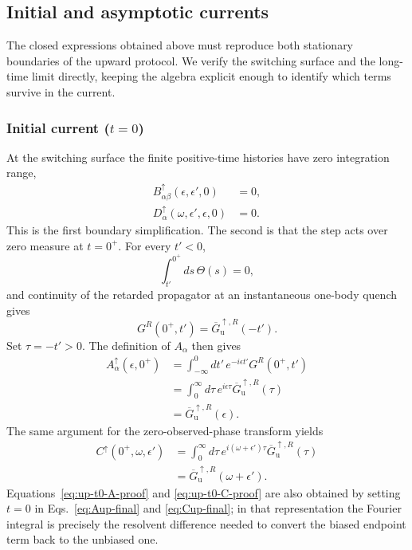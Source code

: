 \documentclass[
 reprint,
 superscriptaddress,
 amsmath,amssymb,
 aps,prb,
 longbibliography,
 floatfix
]{revtex4-2}
\begin{document}
\subsection{Initial and asymptotic currents}
\label{sec:up-initial-asymptotic}

The closed expressions obtained above must reproduce both stationary boundaries of the upward protocol. We verify the switching surface and the long-time limit directly, keeping the algebra explicit enough to identify which terms survive in the current.

\subsubsection{Initial current ($t=0$)}

At the switching surface the finite positive-time histories have zero integration range,
\begin{equation*}
\begin{aligned}
B_{\alpha\beta}^{\uparrow}
(\epsilon,\epsilon',0)&=0,
\\
D_\alpha^{\uparrow}
(\omega,\epsilon',\epsilon,0)&=0.
\end{aligned}
\end{equation*}
This is the first boundary simplification. The second is that the step acts over zero measure at $t=0^+$. For every $t'<0$,
\begin{equation*}
\int_{t'}^{0^+}ds\,\Theta(s)=0,
\end{equation*}
and continuity of the retarded propagator at an instantaneous one-body quench gives
\begin{equation*}
G^R(0^+,t')
=
\overline G_{\mathrm u}^{\uparrow,R}(-t').
\end{equation*}
Set $\tau=-t'>0$. The definition of $A_\alpha$ then gives
\begin{equation}
\begin{aligned}
A_\alpha^\uparrow(\epsilon,0^+)
&=
\int_{-\infty}^{0}dt'\,
 e^{-i\epsilon t'}G^R(0^+,t')
\\
&=
\int_0^\infty d\tau\,
 e^{i\epsilon\tau}
 \overline G_{\mathrm u}^{\uparrow,R}(\tau)
\\
&=
\overline G_{\mathrm u}^{\uparrow,R}(\epsilon).
\end{aligned}
\label{eq:up-t0-A-proof}
\end{equation}
The same argument for the zero-observed-phase transform yields
\begin{equation}
\begin{aligned}
C^\uparrow(0^+,\omega,\epsilon')
&=
\int_0^\infty d\tau\,
 e^{i(\omega+\epsilon')\tau}
 \overline G_{\mathrm u}^{\uparrow,R}(\tau)
\\
&=
\overline G_{\mathrm u}^{\uparrow,R}
(\omega+\epsilon').
\end{aligned}
\label{eq:up-t0-C-proof}
\end{equation}
Equations~\eqref{eq:up-t0-A-proof} and \eqref{eq:up-t0-C-proof} are also obtained by setting $t=0$ in Eqs.~\eqref{eq:Aup-final} and \eqref{eq:Cup-final}; in that representation the Fourier integral is precisely the resolvent difference needed to convert the biased endpoint term back to the unbiased one.
\end{document}
